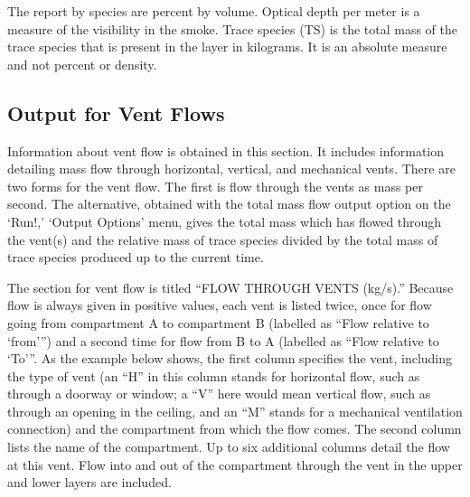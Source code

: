 The report by species are percent by volume. Optical depth per meter is a measure of the visibility in the smoke. Trace species (TS) is the total mass of the trace species that is present in the layer in kilograms. It is an absolute measure and not percent or density.

\subsection{Output for Vent Flows}
Information about vent flow is obtained in this section.  It includes information detailing mass flow through horizontal, vertical, and mechanical vents. There are two forms for the vent flow. The first is flow through the vents as mass per second. The alternative, obtained with the total mass flow output option on the `Run!,' `Output Options' menu, gives the total mass which has flowed through the vent(s) and the relative mass of trace species divided by the total mass of trace species produced up to the current time.

The section for vent flow is titled ``FLOW THROUGH VENTS (kg/s).''  Because flow is always given in positive values, each vent is listed twice, once for flow going from compartment A to compartment B (labelled as ``Flow relative to `from''') and a second time for flow from B to A (labelled as ``Flow relative to `To'''.  As the example below shows, the first column specifies the vent, including the type of vent (an ``H'' in this column stands for horizontal flow, such as through a doorway or window; a ``V'' here would mean vertical flow, such as through an opening in the ceiling, and an ``M'' stands for a mechanical ventilation connection) and the compartment from which the flow comes. The second column lists the name of the compartment. Up to six additional columns detail the flow at this vent. Flow into and out of the compartment through the vent in the upper and lower layers are included.

